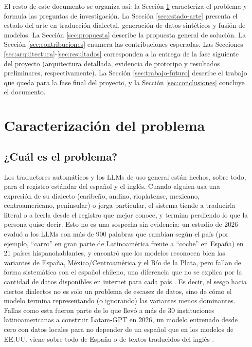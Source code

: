 \documentclass[11pt,a4paper]{article}
\begin{document}
El resto de este documento se organiza así: la Sección \ref{sec:problema} caracteriza el problema y formula las preguntas de investigación. La Sección \ref{sec:estado-arte} presenta el estado del arte en traducción dialectal, generación de datos sintéticos y fusión de modelos. La Sección \ref{sec:propuesta} describe la propuesta general de solución. La Sección \ref{sec:contribuciones} enumera las contribuciones esperadas. Las Secciones \ref{sec:arquitectura}-\ref{sec:resultados} corresponden a la entrega de la fase siguiente del proyecto (arquitectura detallada, evidencia de prototipo y resultados preliminares, respectivamente). La Sección \ref{sec:trabajo-futuro} describe el trabajo que queda para la fase final del proyecto, y la Sección \ref{sec:conclusiones} concluye el documento.



\section{Caracterización del problema}
\label{sec:problema}

\subsection{¿Cuál es el problema?}

Los traductores automáticos y los LLMs de uso general están hechos, sobre todo, para el registro estándar del español y el inglés. Cuando alguien usa una expresión de su dialecto (caribeño, andino, rioplatense, mexicano, centroamericano, peninsular) o jerga particular, el sistema tiende a traducirla literal o a leerla desde el registro que mejor conoce, y termina perdiendo lo que la persona quiso decir. Esto no es una sospecha sin evidencia: un estudio de 2026 evaluó a los LLMs con más de 900 palabras que cambian según el país (por ejemplo, ``carro'' en gran parte de Latinoamérica frente a ``coche'' en España) en 21 países hispanohablantes, y encontró que los modelos reconocen bien las variantes de España, México/Centroamérica y el Río de la Plata, pero fallan de forma sistemática con el español chileno, una diferencia que no se explica por la cantidad de datos disponibles en internet para cada país \cite{kawasaki2026bias}. Es decir, el sesgo hacia ciertos dialectos no es solo un problema de escasez de datos, sino de cómo el modelo termina representando (o ignorando) las variantes menos dominantes. Fallas como esta fueron parte de lo que llevó a más de 30 instituciones latinoamericanas a construir Latam-GPT en 2026, un modelo entrenado desde cero con datos locales para no depender de un español que en los modelos de EE.UU. viene sobre todo de España o de textos traducidos del inglés \cite{restofworld2025latamgpt}.
\end{document}
